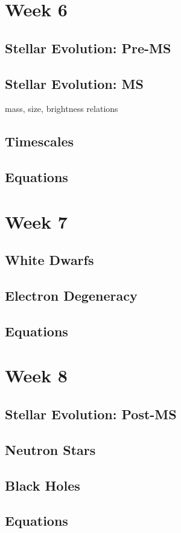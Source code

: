 \documentclass[a4paper,10pt]{article}
\begin{document}
\newpage
\section{Week 6}

\subsection{Stellar Evolution: Pre-MS}

\subsection{Stellar Evolution: MS}
mass, size, brightness relations

\subsection{Timescales}

\subsection{Equations}

 

\newpage
\section{Week 7}

\subsection{White Dwarfs}

\subsection{Electron Degeneracy}

\subsection{Equations}

\newpage
\section{Week 8}

\subsection{Stellar Evolution: Post-MS}

\subsection{Neutron Stars}

\subsection{Black Holes}

\subsection{Equations}
\end{document}
